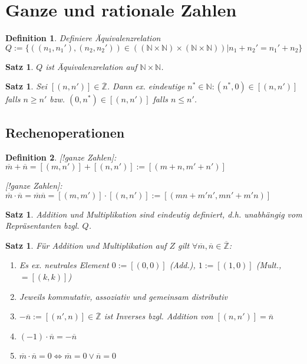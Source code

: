 \documentclass[ngerman,a4paper]{report}
\theoremstyle{break}
\newtheorem{satz}[theorem]{Satz}
\newtheorem*{definition}{Definition}
\begin{document}
\section{Ganze und rationale Zahlen}
\begin{definition}
	Definiere Äquivalenzrelation $Q:=\{ ((n_1,n_1'),(n_2,n_2'))\in((\mathbb{N}\times\mathbb{N})\times(\mathbb{N}\times\mathbb{N})) | n_1+n_2' = n_1' + n_2 \}$
\end{definition}
\begin{satz}
	$Q$ ist Äquivalenzrelation auf $\mathbb{N}\times\mathbb{N}$.
\end{satz}

\begin{satz}
	Sei $[(n,n')]\in\overline{\mathbb{Z}}$. Dann ex. eindeutige $n^{*}\in\mathbb{N}:(n^{*},0)\in[(n,n')]$ falls $n\geq n'$ bzw. $(0,n^{*})\in[(n,n')]$ falls $n\leq n'$.
\end{satz}

\subsection*{Rechenoperationen}
\begin{definition}
	[!ganze Zahlen]: $\overline{m}+\overline{n} = [(m,n')] + [(n,n')] :=[(m+n,m'+n')]$
	
	[!ganze Zahlen]: $\overline{m}\cdot\overline{n} = \overline{m}\overline{n} = [(m,m')]\cdot[(n,n')]:=[(mn+m'n',mn'+m'n)]$
\end{definition}

\begin{satz}
	Addition und Multiplikation sind eindeutig definiert, d.h. unabhängig vom Repräsentanten bzgl. $Q$.
\end{satz}

\begin{satz}
	Für Addition und Multiplikation auf $Z$ gilt $\forall \overline{m},\overline{n}\in\overline{\mathbb{Z}}$:
	\begin{enumerate}[label={\arabic*)}]
		\item Es ex. neutrales Element $0:=[(0,0)]$ (Add.), $1:=[(1,0)]$ (Mult., $=[(k,k)]$)
		\item Jeweils kommutativ, assoziativ und gemeinsam distributiv
		\item $-\overline{n} := [(n',n)]\in\overline{\mathbb{Z}}$ ist Inverses bzgl. Addition von $[(n,n')]=\overline{n}$
		\item $(-1)\cdot \overline{n} = -\overline{n}$
		\item $\overline{m}\cdot\overline{n} = 0 \Leftrightarrow \overline{m} = 0 \lor \overline{n} = 0$
	\end{enumerate}
\end{satz}
\end{document}
